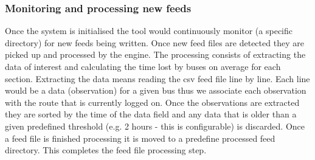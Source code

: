 \subsubsection{Monitoring and processing new feeds}
Once the system is initialised the tool would continuously monitor (a specific directory) for new feeds being written. Once new feed files are detected they are picked up and processed by the engine. The processing consists of extracting the data of interest and calculating the time lost by buses on average for each section. Extracting the data means reading the csv feed file line by line. Each line would be a data (observation) for a given bus thus we associate each observation with the route that is currently logged on. Once the observations are extracted they are sorted by the time of the data field and any data that is older than a given predefined threshold (e.g. 2 hours - this is configurable) is discarded. Once a feed file is finished processing it is moved to a predefine processed feed directory. This completes the feed file processing step.
	
